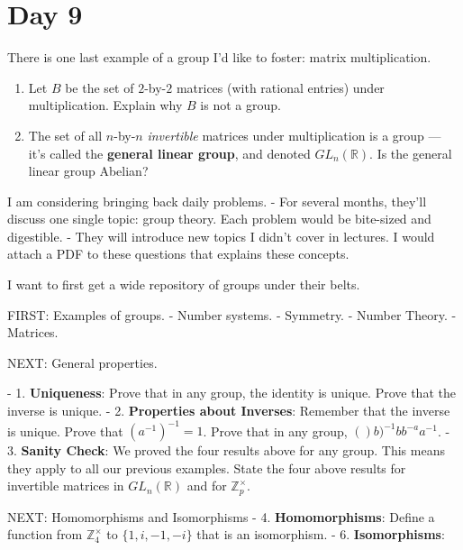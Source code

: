 \documentclass[11pt]{article}
\begin{document}

\section{Day 9}

There is one last example of a group I'd like to foster: matrix multiplication.
\begin{enumerate}
  \item Let $B$ be the set of $2$-by-$2$ matrices (with rational entries) under multiplication. Explain why $B$ is not a group.
  \item The set of all $n$-by-$n$ \textit{invertible} matrices under multiplication is a group --- it's called the \textbf{general linear group}, and denoted $GL_{n}(\mathbb{R})$. Is the general linear group Abelian?
\end{enumerate}


I am considering bringing back daily problems.
- For several months, they'll discuss one single topic: group theory. Each problem would be bite-sized and digestible.
- They will introduce new topics I didn't cover in lectures. I would attach a PDF to these questions that explains these concepts.


I want to first get a wide repository of groups under their belts.

FIRST: Examples of groups.
- Number systems. %
- Symmetry. %
- Number Theory. %
- Matrices. %

NEXT: General properties. 

- 1. \textbf{Uniqueness}: Prove that in any group, the identity is unique. Prove that the inverse is unique.
- 2. \textbf{Properties about Inverses}: Remember that the inverse is unique. Prove that $(a^{-1})^{-1} = 1$. Prove that in any group, $()b)^{-1} b b^{-a}a^{-1}$.
- 3. \textbf{Sanity Check}: We proved the four results above for any group. This means they apply to all our previous examples. State the four above results for invertible matrices in $GL_{n}(\mathbb{R})$ and for $\mathbb{Z}_{p}^{\times }$.

NEXT: Homomorphisms and Isomorphisms
- 4. \textbf{Homomorphisms}: Define a function from $\mathbb{Z}_{4}^{\times}$ to $\{ 1, i, -1, -i \}$ that is an isomorphism.
- 6. \textbf{Isomorphisms}: 

\end{document}
